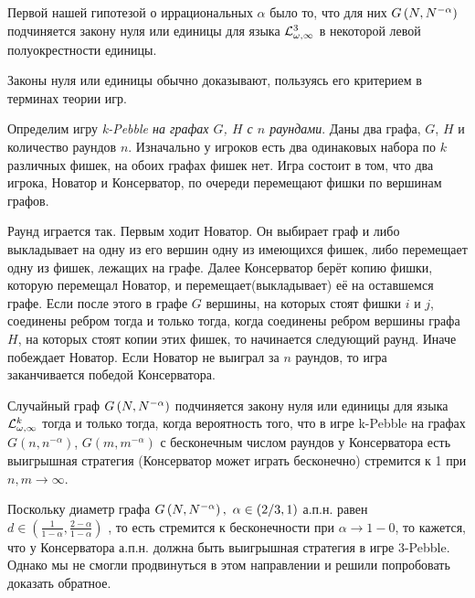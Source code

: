 Первой нашей гипотезой о иррациональных $\alpha$ было то, что для них $G\left(N,N^{-\alpha}\right)$ подчиняется закону нуля или единицы для языка $\mathcal{L}^3_{\omega, \infty}$ в некоторой левой полуокрестности единицы.

Законы нуля или единицы обычно доказывают, пользуясь его критерием в терминах теории игр.

Определим игру \textit{k-Pebble на графах $G$, $H$ с $n$ раундами}.
Даны два графа, $G$, $H$ и количество раундов $n$.
Изначально у игроков есть два одинаковых набора по $k$ различных фишек, на обоих графах фишек нет.
Игра состоит в том, что два игрока, Новатор и Консерватор, по очереди перемещают фишки по вершинам графов.%

Раунд играется так. 
Первым ходит Новатор.
Он выбирает граф и либо выкладывает на одну из его вершин одну из имеющихся фишек, либо перемещает одну из фишек, лежащих на графе.
Далее Консерватор берёт копию фишки, которую перемещал Новатор, и перемещает(выкладывает) её на оставшемся графе.
Если после этого в графе $G$ вершины, на которых стоят фишки $i$ и $j$, соединены ребром тогда и только тогда, когда соединены ребром вершины графа $H$, на которых стоят копии этих фишек, то начинается следующий раунд.
Иначе побеждает Новатор.
Если Новатор не выиграл за $n$ раундов, то игра заканчивается победой Консерватора.

\begin{theorem} \cite{zhukovskii2012zero}
Случайный граф $G\left(N,N^{-\alpha}\right)$ подчиняется закону нуля или единицы для языка $\mathcal{L}^k_{\omega, \infty}$ тогда и только тогда, когда вероятность того, что в игре k-Pebble на графах $G(n, n^{-\alpha})$, $G(m, m^{-\alpha})$  с бесконечным числом раундов у Консерватора есть выигрышная стратегия (Консерватор может играть бесконечно) стремится к 1 при $n,m \rightarrow \infty$.
\end{theorem}

Поскольку диаметр графа $G\left(N,N^{-\alpha}\right),~ \alpha \in (2/3, 1)$ а.п.н. равен $d \in \left(\frac{1}{1-\alpha}, \frac{2-\alpha}{1-\alpha}\right)$ \cite{bollobas2001random}, то есть стремится к бесконечности при $\alpha \rightarrow 1 - 0$, то кажется, что у Консерватора а.п.н. должна быть выигрышная стратегия в игре 3-Pebble.
Однако мы не смогли продвинуться в этом направлении и решили попробовать доказать обратное.

